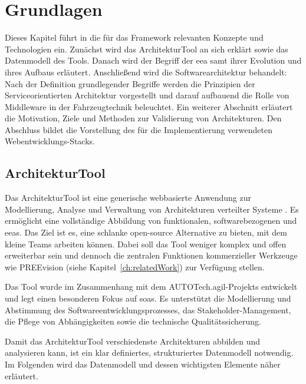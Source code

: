 \chapter{Grundlagen}
\label{ch:basics}

Dieses Kapitel führt in die für das Framework relevanten Konzepte und Technologien ein. Zunächst wird das ArchitekturTool an sich erklärt sowie das Datenmodell des Tools. Danach wird der Begriff der \gls{eea} samt ihrer Evolution und ihres Aufbaus erläutert. Anschließend wird die Softwarearchitektur behandelt: Nach der Definition grundlegender Begriffe werden die Prinzipien der Serviceorientierten Architektur vorgestellt und darauf aufbauend die Rolle von Middleware in der Fahrzeugtechnik beleuchtet. Ein weiterer Abschnitt erläutert die Motivation, Ziele und Methoden zur Validierung von Architekturen. Den Abschluss bildet die Vorstellung des für die Implementierung verwendeten Webentwicklungs-Stacks.


\section{ArchitekturTool}
\label{sec:tool}

Das ArchitekturTool ist eine generische webbasierte Anwendung zur Modellierung, Analyse und Verwaltung von Architekturen verteilter Systeme \cite{architekturtooldocu2024}. Es ermöglicht eine vollständige Abbildung von funktionalen, softwarebezogenen und \glspl{eea}. Das Ziel ist es, eine schlanke open-source Alternative zu bieten, mit dem kleine Teams arbeiten können. Dabei soll das Tool weniger komplex und offen erweiterbar sein und dennoch die zentralen Funktionen kommerzieller Werkzeuge wie PREEvision (siehe Kapitel~\ref{ch:relatedWork}) zur Verfügung stellen.

Das Tool wurde im Zusammenhang mit dem AUTOTech.agil-Projekts entwickelt und legt einen besonderen Fokus auf \glspl{soa}. Es unterstützt die Modellierung und Abstimmung des Softwareentwicklungsprozesses, das Stakeholder-Management, die Pflege von Abhängigkeiten sowie die technische Qualitätssicherung.

Damit das ArchitekturTool verschiedenste Architekturen abbilden und analysieren kann, ist ein klar definiertes, strukturiertes Datenmodell notwendig. Im Folgenden wird das Datenmodell und dessen wichtigsten Elemente näher erläutert.


